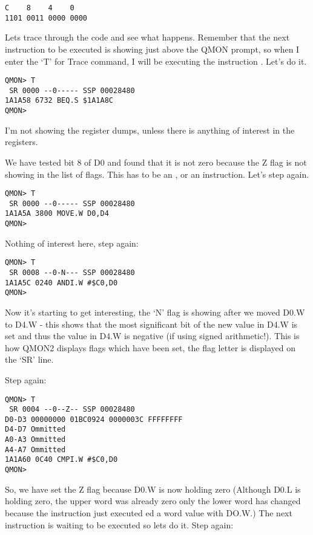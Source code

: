 \begin{appendix}
\begin{lstlisting}[frame=none,numbers=none,]
   C    8    4    0
1101 0011 0000 0000
\end{lstlisting}

Lets trace through the code and see what happens. Remember that the next
instruction to be executed is showing just above the QMON prompt, so when I
enter the `T' for Trace command, I will be executing the instruction . Let's do it.

\begin{lstlisting}[frame=none,numbers=none,]
QMON> T
 SR 0000 --0----- SSP 00028480
1A1A58 6732 BEQ.S $1A1A8C
QMON>
\end{lstlisting}

I'm not showing the register dumps, unless there is anything of interest in the
registers.

We have tested bit 8 of D0 and found that it is not zero because the Z flag is
not showing in the list of flags. This has to be an ,  or an 
instruction. Let's step again.

\begin{lstlisting}[frame=none,numbers=none,]
QMON> T
 SR 0000 --0----- SSP 00028480
1A1A5A 3800 MOVE.W D0,D4
QMON>
\end{lstlisting}

Nothing of interest here, step again:

\begin{lstlisting}[frame=none,numbers=none,]
QMON> T
 SR 0008 --0-N--- SSP 00028480
1A1A5C 0240 ANDI.W #$C0,D0
QMON>
\end{lstlisting}

Now it's starting to get interesting, the `N' flag is showing after we moved
D0.W to D4.W -{} this shows that the most significant bit of the new value in D4.W
is set and thus the value in D4.W is negative (if using signed arithmetic!).
This is how QMON2 displays flags which have been set, the flag letter is
displayed on the `SR' line.

Step again:

\begin{lstlisting}[frame=none,numbers=none,]
QMON> T
 SR 0004 --0--Z-- SSP 00028480
D0-D3 00000000 01BC0924 0000003C FFFFFFFF
D4-D7 Ommitted
A0-A3 Ommitted
A4-A7 Ommitted
1A1A60 0C40 CMPI.W #$C0,D0
QMON>
\end{lstlisting}

So, we have set the Z flag because D0.W is now holding zero (Although D0.L is
holding zero, the upper word was already zero only the lower word has changed
because the instruction just executed ed a word value with DO.W.) The next
instruction is waiting to be executed so lets do it. Step again:


\end{appendix}
